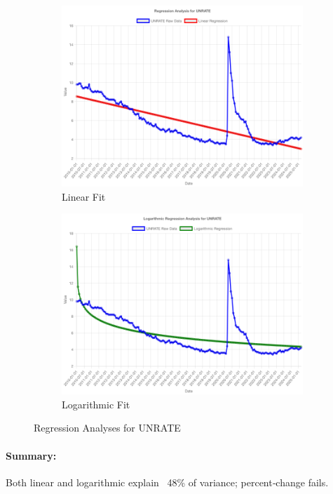 \documentclass[11pt,a4paper]{article}
\begin{document}
\begin{figure}[htbp]
  \centering
  \begin{subfigure}[b]{0.48\textwidth}
    \includegraphics[width=\textwidth]{backend/analyses/UNRATE_analysis.png}
    \caption{Linear Fit}
  \end{subfigure}
  \hfill
  \begin{subfigure}[b]{0.48\textwidth}
    \includegraphics[width=\textwidth]{backend/analyses/UNRATE_log_analysis.png}
    \caption{Logarithmic Fit}
  \end{subfigure}
  \caption{Regression Analyses for UNRATE}
\end{figure}

\paragraph{Summary:}
Both linear and logarithmic explain ~48\% of variance; percent‐change fails.
\end{document}
